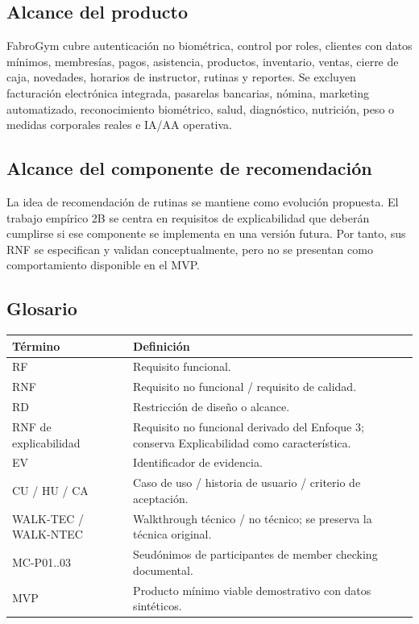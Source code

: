\documentclass[11pt,a4paper,twoside]{article}
\begin{document}
\subsection{Alcance del producto}
FabroGym cubre autenticación no biométrica, control por roles, clientes con datos mínimos, membresías, pagos, asistencia, productos, inventario, ventas, cierre de caja, novedades, horarios de instructor, rutinas y reportes. Se excluyen facturación electrónica integrada, pasarelas bancarias, nómina, marketing automatizado, reconocimiento biométrico, salud, diagnóstico, nutrición, peso o medidas corporales reales e IA/AA operativa.

\subsection{Alcance del componente de recomendación}
La idea de recomendación de rutinas se mantiene como evolución propuesta. El trabajo empírico 2B se centra en requisitos de explicabilidad que deberán cumplirse si ese componente se implementa en una versión futura. Por tanto, sus RNF se especifican y validan conceptualmente, pero no se presentan como comportamiento disponible en el MVP.

\subsection{Glosario}
\begin{tabularx}{\textwidth}{p{2.7cm}X}\toprule
Término & Definición \\ \midrule
RF & Requisito funcional.\\
RNF & Requisito no funcional / requisito de calidad.\\
RD & Restricción de diseño o alcance.\\
RNF de explicabilidad & Requisito no funcional derivado del Enfoque 3; conserva Explicabilidad como característica.\\
EV & Identificador de evidencia.\\
CU / HU / CA & Caso de uso / historia de usuario / criterio de aceptación.\\
WALK-TEC / WALK-NTEC & Walkthrough técnico / no técnico; se preserva la técnica original.\\
MC-P01..03 & Seudónimos de participantes de member checking documental.\\
MVP & Producto mínimo viable demostrativo con datos sintéticos.\\
\bottomrule\end{tabularx}
\end{document}
